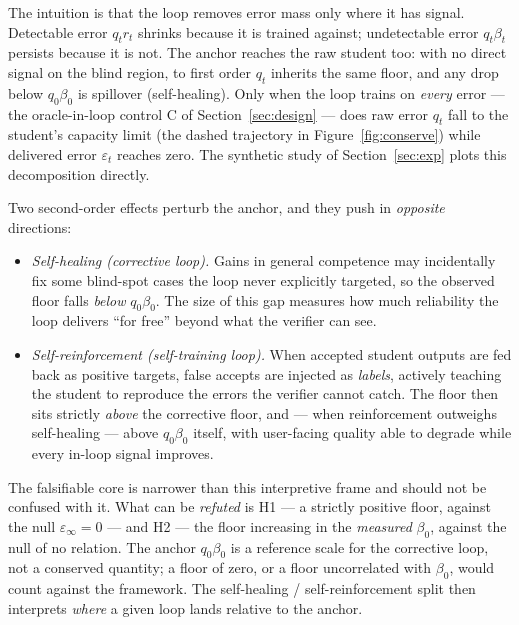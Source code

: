 \documentclass[11pt]{article}
\begin{document}
The intuition is that the loop removes error mass only where it has
signal. Detectable error \(q_{t}r_{t}\) shrinks because it is trained
against; undetectable error \(q_{t}\beta_{t}\) persists because it is
not. The anchor reaches the raw student too: with no direct signal on
the blind region, to first order \(q_{t}\) inherits the same floor, and
any drop below \(q_{0}\beta_{0}\) is spillover (self-healing). Only when
the loop trains on \emph{every} error --- the oracle-in-loop control C
of Section~\ref{sec:design} --- does raw error \(q_{t}\) fall to the
student's capacity limit (the dashed trajectory in
Figure~\ref{fig:conserve}) while delivered error \(\varepsilon_{t}\)
reaches zero. The synthetic study of Section~\ref{sec:exp} plots this
decomposition directly.

Two second-order effects perturb the anchor, and they push in
\emph{opposite} directions:

\begin{itemize}
\item
  \emph{Self-healing (corrective loop).} Gains in general competence may
  incidentally fix some blind-spot cases the loop never explicitly
  targeted, so the observed floor falls \emph{below} \(q_{0}\beta_{0}\).
  The size of this gap measures how much reliability the loop delivers
  ``for free'' beyond what the verifier can see.
\item
  \emph{Self-reinforcement (self-training loop).} When accepted student
  outputs are fed back as positive targets, false accepts are injected
  as \emph{labels}, actively teaching the student to reproduce the
  errors the verifier cannot catch. The floor then sits strictly
  \emph{above} the corrective floor, and --- when reinforcement
  outweighs self-healing --- above \(q_{0}\beta_{0}\) itself, with
  user-facing quality able to degrade while every in-loop signal
  improves.
\end{itemize}

The falsifiable core is narrower than this interpretive frame and should
not be confused with it. What can be \emph{refuted} is H1 --- a strictly
positive floor, against the null \(\varepsilon_{\infty} = 0\) --- and H2
--- the floor increasing in the \emph{measured} \(\beta_{0}\), against
the null of no relation. The anchor \(q_{0}\beta_{0}\) is a reference
scale for the corrective loop, not a conserved quantity; a floor of
zero, or a floor uncorrelated with \(\beta_{0}\), would count against
the framework. The self-healing / self-reinforcement split then
interprets \emph{where} a given loop lands relative to the anchor.
\end{document}
